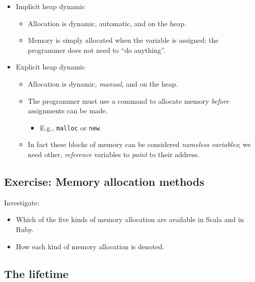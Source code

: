 \documentclass[11pt]{article}
\theoremstyle{definition}
\begin{document}
\begin{itemize}
\item Implicit heap dynamic
\begin{itemize}
\item Allocation is dynamic, automatic, and on the heap.
\item Memory is simply allocated when the variable is assigned;
the programmer does not need to “do anything”.
\end{itemize}
\item Explicit heap dynamic
\begin{itemize}
\item Allocation is dynamic, \emph{manual}, and on the heap.
\item The programmer must use a command to allocate memory
\emph{before} assignments can be made.
\begin{itemize}
\item E.g., \texttt{malloc} or \texttt{new}.
\end{itemize}
\item In fact these blocks of memory can be considered
\emph{nameless variables}; we need other,
\emph{reference} variables to \emph{point} to their address.
\end{itemize}
\end{itemize}

\subsection{Exercise: Memory allocation methods}
\label{sec:org9eed82b}

Investigate:
\begin{itemize}
\item Which of the five kinds of memory allocation are available in
Scala and in Ruby.
\item How each kind of memory allocation is denoted.
\end{itemize}

\subsection{The lifetime}
\label{sec:org6190c27}
\end{document}
